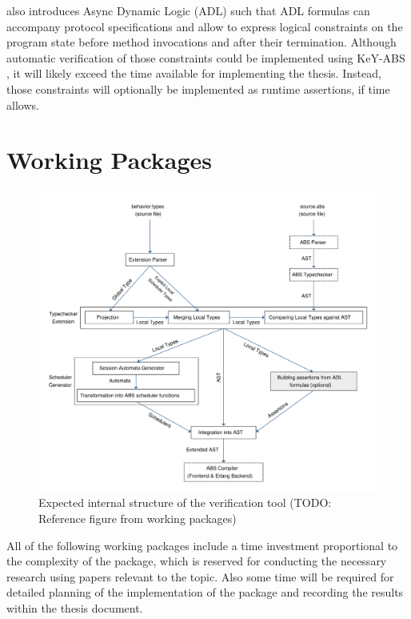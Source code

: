 \documentclass[paper=a4,nochapname,accentcolor=tud9c]{tudexercise}
\begin{document}

\cite{kamburjan2018stateful} also introduces Async Dynamic Logic (ADL) such that ADL formulas can
accompany protocol specifications and allow to express logical constraints on the
program state before method invocations and after their termination.
Although automatic verification of those constraints could  be implemented using
KeY-ABS \cite{din2015key}, it will likely exceed the time available for
implementing the thesis.
Instead, those constraints will optionally be implemented as runtime assertions,
if time allows.

\section{Working Packages}\label{workpackages}
%
\begin{figure}[H]
  \centering
  \includegraphics[width=\linewidth]{assets/architecture.pdf}
  \caption{Expected internal structure of the verification tool (TODO: Reference figure from working packages)}
\end{figure}

All of the following working packages include a time investment proportional to the
complexity of the package, which is reserved for conducting the necessary
research using papers relevant to the topic. Also some time will be required for
detailed planning of the implementation of the package and recording the results
within the thesis document.
\end{document}
